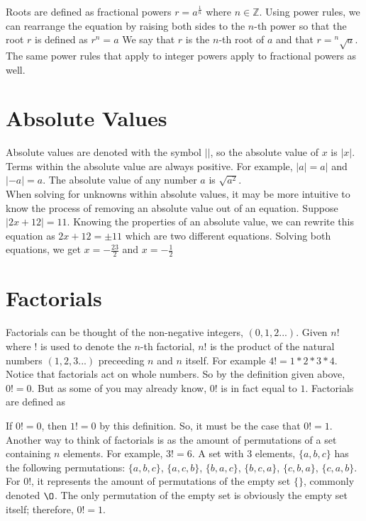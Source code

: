 \documentclass[12pt]{report}
\begin{document}
Roots are defined as fractional powers $r=a^{\frac{1}{n}}$ where $n \in \mathbb{Z}$.
Using power rules, we can rearrange the equation by raising both sides to the $n$-th power so that the root $r$ is defined as $r^n=a$ We say that $r$ is the $n$-th root of $a$ and that $r={^{n}\sqrt{a}}$. The same power rules that apply to integer powers apply to fractional powers as well.

\section{Absolute Values}

\hspace{\parindent}Absolute values are denoted with the symbol $||$, so the absolute value of $x$ is $|x|$. Terms within the absolute value are always positive. For example, $|a|=a|$ and $|-a|=a$. The absolute value of any number $a$ is $\sqrt{a^2}$.\medskip\\
When solving for unknowns within absolute values, it may be more intuitive to know the process of removing an absolute value out of an equation. Suppose $|2x+12|=11$. Knowing the properties of an absolute value, we can rewrite this equation as $2x+12=\pm 11$ which are two different equations. Solving both equations, we get $x=-\frac{23}{2}$ and $x=-\frac{1}{2}$

\section{Factorials}

\hspace{\parindent}Factorials can be thought of the non-negative integers, $(0, 1, 2...)$. Given $n!$ where $!$ is used to denote the $n$-th factorial, $n!$ is the product of the natural numbers $(1, 2, 3...)$ preceeding $n$ and $n$ itself. For example $4!=1*2*3*4$. Notice that factorials act on whole numbers. So by the definition given above, $0!=0$. But as some of you may already know, $0!$ is in fact equal to $1$. Factorials are defined as\bigskip

\bigskip

If $0!=0$, then $1!=0$ by this definition. So, it must be the case that $0!=1$.\\Another way to think of factorials is as the amount of permutations of a set containing $n$ elements. For example, $3!=6$. A set with $3$ elements, $\{a, b, c\}$ has the following permutations: $\{a, b, c\}$, $\{a, c, b\}$, $\{b, a, c\}$, $\{b, c, a\}$, $\{c, b, a\}$, $\{c, a, b\}$. For $0!$, it represents the amount of permutations of the empty set $\{\}$, commonly denoted $\O$. The only permutation of the empty set is obviously the empty set itself; therefore, $0!=1$.
\end{document}
